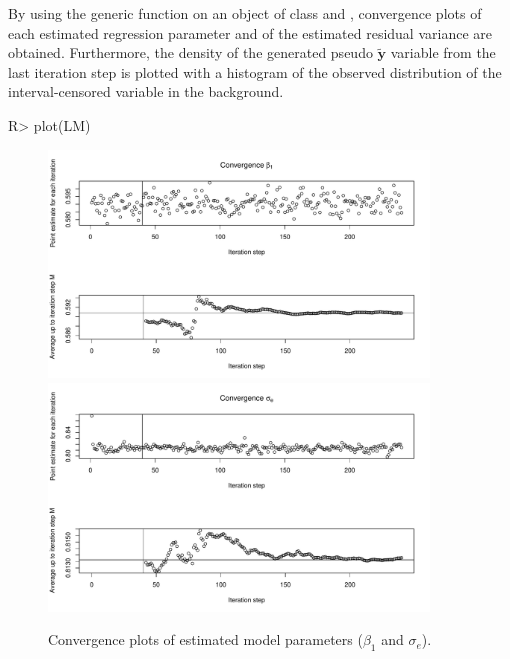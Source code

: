 By using the generic function  on an object of class  and , convergence plots of each estimated regression parameter and of the estimated residual variance are obtained. Furthermore, the density of the generated pseudo \(\mathbf{\tilde{y}}\) variable from the last iteration step is plotted with a histogram of the observed distribution of the interval-censored variable  in the background.

\begin{example}
R> plot(LM)
\end{example}

\begin{figure}[ht]
  \centering
    \includegraphics[width=0.9\textwidth]{beta1.pdf}
    \includegraphics[width=0.9\textwidth]{sigmae.pdf}
     \caption{Convergence plots of estimated model parameters ($\beta_{1}$ and $\sigma_{e}$).}
     \label{Fig:semCon}
\end{figure}

